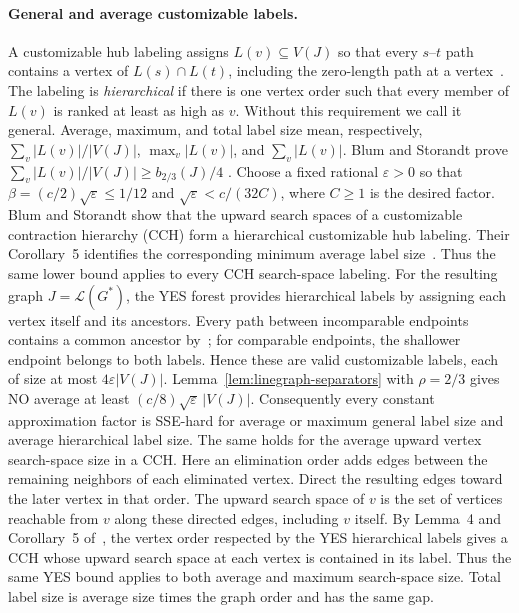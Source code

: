 \paragraph{General and average customizable labels.}
A customizable hub labeling assigns $L(v)\subseteq V(J)$ so that
every $s$--$t$ path contains a vertex of $L(s)\cap L(t)$, including the zero-length
path at a vertex~\cite{BlumStorandt2023}.
The labeling is \emph{hierarchical} if there is one vertex order
such that every member of $L(v)$ is ranked at least as high as
$v$. Without this requirement we call it general. Average,
maximum, and total label size mean, respectively,
$\sum_v|L(v)|/|V(J)|$, $\max_v|L(v)|$, and $\sum_v|L(v)|$.
Blum and Storandt prove
$\sum_v|L(v)|/|V(J)|\geq b_{2/3}(J)/4$
\cite[Corollary 10, full version]{BlumStorandt2023}.
Choose a fixed rational $\varepsilon>0$ so that
$\beta=(c/2)\sqrt\varepsilon\leq1/12$ and
$\sqrt\varepsilon<c/(32C)$, where $C\ge1$ is the desired factor.
Blum and Storandt show that the upward search spaces of a
customizable contraction hierarchy (CCH) form a hierarchical customizable
hub labeling. Their Corollary~5 identifies the corresponding minimum
average label size~\cite[Corollary 5, full version]{BlumStorandt2023}.
Thus the same lower bound applies to every CCH search-space labeling.
For the resulting graph $J=\mathcal L(G^*)$, the YES forest provides hierarchical
labels by assigning each vertex itself and its ancestors.
Every path between incomparable endpoints contains a common ancestor
by~\cite[Observation~2.2]{GiannopoulouEtAl2017}; for comparable endpoints,
the shallower endpoint belongs to both labels. Hence these are valid
customizable labels, each of size at most $4\varepsilon |V(J)|$.
Lemma~\ref{lem:linegraph-separators}
with $\rho=2/3$ gives NO average at least
$(c/8)\sqrt\varepsilon\,|V(J)|$. Consequently every constant
approximation factor is \textup{SSE}-hard for average or maximum general
label size and average hierarchical label size. The same holds for
the average upward vertex search-space size in a CCH. Here an
elimination order adds edges
between the remaining neighbors of each eliminated vertex. Direct
the resulting edges toward the later vertex in that order.
The upward search space of $v$ is the set of vertices reachable
from $v$ along these directed edges, including $v$ itself.
By Lemma~4 and Corollary~5 of~\cite{BlumStorandt2023}, the vertex
order respected by the YES hierarchical labels gives a CCH whose
upward search space at each vertex is contained in its label.
Thus the same YES bound applies to both average and maximum
search-space size.
Total label size is average size times the
graph order and has the same gap.

